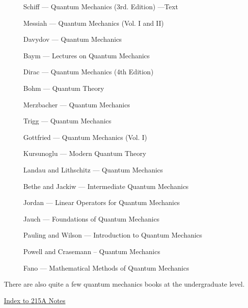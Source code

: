 \documentclass[epsf]{article}
\begin{document}
\begin{description}
\item[] Schiff  --- Quantum Mechanics (3rd. Edition) ---Text
\item[] Messiah --- Quantum Mechanics (Vol. I and II) 
\item[] Davydov --- Quantum Mechanics 
\item[] Baym    --- Lectures on Quantum Mechanics
\item[] Dirac   --- Quantum Mechanics (4th Edition)
\item[] Bohm    --- Quantum Theory
\item[] Merzbacher --- Quantum Mechanics
\item[] Trigg   --- Quantum Mechanics
\item[] Gottfried --- Quantum Mechanics (Vol. I)
\item[] Kursunoglu --- Modern Quantum Theory
\item[] Landau and Lithschitz --- Quantum Mechanics 
\item[] Bethe and Jackiw --- Intermediate Quantum Mechanics
\item[] Jordan --- Linear Operators for Quantum Mechanics
\item[] Jauch --- Foundations of Quantum Mechanics
\item[] Pauling and Wilson --- Introduction to Quantum Mechanics
\item[] Powell and Crasemann -- Quantum Mechanics
\item[] Fano --- Mathematical Methods of Quantum Mechanics
\end{description}

There are also quite a few quantum mechanics books at the undergraduate
level.

\newpage

\underline{Index to 215A Notes}
\end{document}
